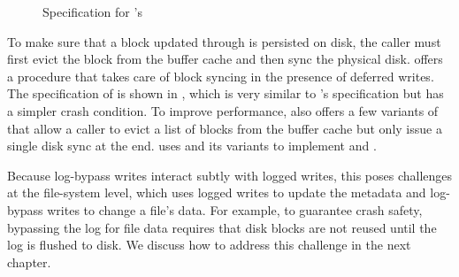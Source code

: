 \begin{figure}[htb]
\centering
\begin{spec}
\end{spec}
\caption{Specification for \logapi's }
\label{fig:log_dsync_ok}
\end{figure}

To make sure that a block updated through  is persisted on
disk, the caller must first evict the block from the buffer cache and then
sync the physical disk.  \syslog offers a  procedure that
takes care of block syncing in the presence of deferred writes.  The
specification of  is shown in , which
is very similar to 's specification but has a simpler crash
condition.  To improve performance, \syslog also offers a few variants of
 that allow a caller to evict a list of blocks from the
buffer cache but only issue a single disk sync at the end. \sys uses
 and its variants to implement  and
.

Because log-bypass writes interact subtly with logged writes, this poses
challenges at the file-system level, which uses logged writes to update the
metadata and log-bypass writes to change a file's data.  For example, to
guarantee crash safety, bypassing the log for file data requires that disk
blocks are not reused until the log is flushed to disk.  We discuss how to
address this challenge in the next chapter.


